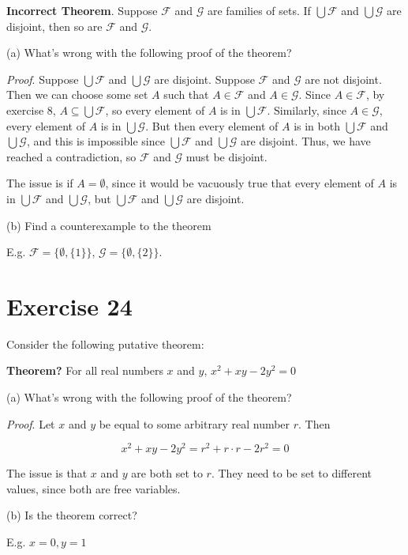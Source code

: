 \documentclass[11pt]{article}
\newcommand{\family}[1]{\mathcal{#1}}
\begin{document}
\textbf{Incorrect Theorem}. Suppose $\family{F}$ and $\family{G}$ are families 
of sets. If $\bigcup \family{F}$ and $\bigcup \family{G}$ are disjoint,
then so are $\family{F}$ and $\family{G}$.

\noindent (a) What's wrong with the following proof of the theorem?

\textit{Proof}. Suppose $\bigcup \family{F}$ and $\bigcup \family{G}$ are
disjoint. Suppose $\family{F}$ and $\family{G}$ are not disjoint. Then we can 
choose some set $A$ such that $A \in \family{F}$ and $A \in \family{G}$. 
Since $A \in \family{F}$, by exercise 8, $A \subseteq \bigcup \family{F}$, so 
every element of $A$ is in $\bigcup \family{F}$. Similarly, since 
$A \in \family{G}$, every element of $A$ is in $\bigcup \family{G}$. But then
every element of $A$ is in both $\bigcup \family{F}$ and $\bigcup \family{G}$, 
and this is impossible since $\bigcup \family{F}$ and $\bigcup \family{G}$ are 
disjoint. Thus, we have reached a contradiction, so $\family{F}$ and $\family{G}$
must be disjoint.

The issue is if $A = \emptyset$, since it would be vacuously true that every 
element of $A$ is in $\bigcup \family{F}$ and $\bigcup \family{G}$, but 
$\bigcup \family{F}$ and $\bigcup \family{G}$ are disjoint.

\noindent (b) Find a counterexample to the theorem 

E.g. $\family{F} = \{\emptyset, \{1\}\}$, $\family{G} = \{ \emptyset, \{2\}\}$.

\section*{Exercise 24} 

Consider the following putative theorem:

\textbf{Theorem?} For all real numbers $x$ and $y$, $x^2 + xy - 2y^2=0$

\noindent (a) What's wrong with the following proof of the theorem?

\textit{Proof}. Let $x$ and $y$ be equal to some arbitrary real number $r$. Then 

$$x^2 + xy - 2y^2 = r^2 + r \cdot r - 2r^2 = 0$$

The issue is that $x$ and $y$ are both set to $r$. They need to be set to
different values, since both are free variables.

\noindent (b) Is the theorem correct?

E.g. $x = 0, y = 1$
\end{document}
